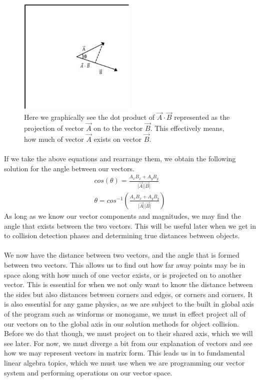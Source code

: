 \documentclass[12pt, letterpaper]{report}
\begin{document}
		\begin{figure}[h]
		\centering
		\includegraphics[width=0.5\textwidth]{Curriculum Images/Vectors/Dot Product/ADotProjB.png}
		\caption{Here we graphically see the dot product of $\vec{A}\cdot\vec{B}$ represented as the projection of vector $\vec{A}$ on to the vector $\vec{B}$. This effectively means, how much of vector $\vec{A}$ exists on vector $\vec{B}$.}
		\end{figure}
		\paragraph{} If we take the above equations and rearrange them, we obtain the following solution for the angle between our vectors.
		\begin{align*}
		cos\left(\theta\right)=\frac{A_xB_x+A_yB_y}{\lvert\vec{A}\rvert\lvert\vec{B}\rvert}\\
		\theta = cos^{-1}\left(\frac{A_xB_x+A_yB_y}{\lvert\vec{A}\rvert\lvert\vec{B}\rvert}\right)
		\end{align*}
As long as we know our vector components and magnitudes, we may find the angle that exists between the two vectors. This will be useful later when we get in to collision detection phases and determining true distances between objects.
		\paragraph{}We now have the distance between two vectors, and the angle that is formed between two vectors. This allows us to find out how far away points may be in space along with how much of one vector exists, or is projected on to another vector. This is essential for when we not only want to know the distance between the sides but also distances between corners and edges, or corners and corners. It is also essential for any game physics, as we are subject to the built in global axis of the program such as winforms or monogame, we must in effect project all of our vectors on to the global axis in our solution methods for object collision. Before we do that though, we must project on to their shared axis, which we will see later. For now, we must diverge a bit from our explanation of vectors and see how we may represent vectors in matrix form. This leads us in to fundamental linear algebra topics, which we must use when we are programming our vector system and performing operations on our vector space.
\end{document}
